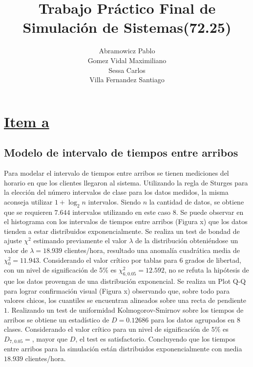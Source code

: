 \documentclass[a4paper,10pt]{article}
\title{Trabajo Pr\'actico Final de Simulaci\'on de Sistemas(72.25)}
\author{
Abramowicz Pablo\\
Gomez Vidal Maximiliano\\
Sessa Carlos\\
Villa Fernandez Santiago\\
}
\begin{document}
\maketitle

\section*{\underline{Item a}}
\subsection{Modelo de intervalo de tiempos entre arribos}
Para modelar el intervalo de tiempos entre arribos se tienen mediciones del
horario en que los clientes llegaron al sistema. Utilizando la regla de
Sturges para la elecci\'on del n\'umero intervalos de clase para los datos
medidos, la misma aconseja utilizar $1 + \log_2 n$ intervalos. Siendo $n$
la cantidad de datos, se obtiene que se requieren $7.644$ intervalos
utilizando en este caso $8$. Se puede observar en el histograma con los
intervalos de tiempos entre arribos (Figura x) que los datos tienden a estar
distribuidos exponencialmente. Se realiza un test de bondad de ajuste
$\chi^2$ estimando previamente el valor $\lambda$ de la distribuci\'on
obteni\'endose un valor de $\lambda = 18.939$ clientes/hora, resultado
una anomal\'ia cuadr\'atica media de $\chi_0^2 = 11.943$. Considerando
el valor cr\'itico por tablas para $6$ grados de libertad, con un nivel
de significaci\'on de 5\% es $\chi_{6,0.05}^2 = 12.592$, no se refuta
la hip\'otesis de que los datos provengan de una distribuci\'on exponencial.
Se realiza un Plot Q-Q para lograr confirmaci\'on visual (Figura x)
observando que, sobre todo para valores chicos, los cuantiles se encuentran
alineados sobre una recta de pendiente $1$. Realizando un test de uniformidad
Kolmogorov-Smirnov sobre los tiempos de arribos se obtiene un estad\'istico
de $D =  0.12686$ para los datos agrupados en $8$ clases. Considerando el
valor cr\'itico para un nivel de significaci\'on de $5\%$ es $D_{7, 0.05} = $,
mayor que $D$, el test es satisfactorio. Concluyendo que los tiempos entre
arribos para la simulaci\'on est\'an distribuidos exponencialmente con media
$18.939$ clientes/hora.
\end{document}
